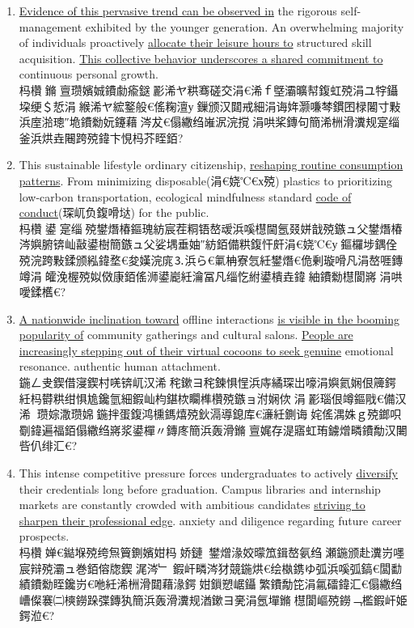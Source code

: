 ﻿\documentclass[lang=cn,11pt]{elegantbook}
\begin{document}
\begin{enumerate}
杩欑鎶€鏈櫙瑙傚湪鎴戜滑鐨勭幇浠ｇぞ浼氱粨鏋勪腑鏃犲涓嶅湪锛屾櫤鑳借澶囧凡鐗㈢墷閿氬畾鍦ㄤ汉绫荤殑瀛樺湪涔嬩腑銆傚叕姘戜滑姘镐箙鍦颁緷璧栫Щ鍔ㄥ簲鐢ㄧ▼搴忔潵澶勭悊浠栦滑鏃ュ父鐨勭ぞ浜や簨鍔°€傚洜姝わ紝浼犵粺鐨勯潰瀵归潰鐩存帴娌熼€氭ā寮忓凡琚牴鏈€у湴鏀瑰彉銆?
\item \underline{Evidence of this pervasive trend can be observed in} the rigorous self-management exhibited by the younger generation. An overwhelming majority of individuals proactively \underline{allocate their leisure hours to} structured skill acquisition. \underline{This collective behavior underscores a shared commitment to} continuous personal growth.\\杩欑鏅亶瓒嬪娍鐨勮瘉鎹彲浠ヤ粠骞磋交涓€浠ｆ墍灞曠幇鍑虹殑涓ユ牸鑷垜绠＄悊涓緱浠ヤ綋鐜般€傜粷澶у鏁颁汉閮戒細涓诲姩灏嗛棽鏆囨椂闂寸敤浜庢湁璁″垝鐨勬妧鑳藉涔犮€傝繖绉嶉泦浣撹涓哄桨鏄句簡浠栦滑瀵规寔缁釜浜烘垚闀跨殑鍏卞悓杩芥眰銆?
\item This sustainable lifestyle  ordinary citizenship, \underline{reshaping routine consumption patterns}. From minimizing disposable(涓€娆℃€х殑) plastics to prioritizing low-carbon transportation, ecological mindfulness  standard \underline{code of conduct}(琛屼负鍑嗗垯) for the public.\\杩欑鍙寔缁殑鐢熸椿鏂瑰紡宸茬粡铻嶅叆浜嗘櫘閫氬叕姘戠殑鏃ュ父鐢熸椿涔嬩腑锛屾敼鍙樹簡鏃ュ父娑堣垂妯″紡銆備粠鍑忓皯涓€娆℃€у鏂欏埗鍝佺殑浣跨敤鍒颁紭鍏堥€夋嫨浣庣⒊浜ら€氭柟寮忥紝鐢熸€佹剰璇嗗凡涓嶅啀鏄竴涓皬浼楃殑姒傚康銆傜浉鍙嶏紝瀹冨凡缁忔紨鍙樻垚鍏紬鐨勬櫘閬嶈涓哄噯鍒欍€?
\item \underline{A nationwide inclination toward} offline interactions \underline{is visible in the booming popularity of} community gatherings and cultural salons. \underline{People are increasingly stepping out of their virtual cocoons to seek genuine} emotional resonance.  authentic human attachment.\\鍦ㄥ叏鍥借寖鍥村唴锛屼汉浠秺鏉ヨ秺鍊惧悜浜庤繘琛岀嚎涓嬩氦娴佷簰鍔紝杩欎粠绀惧尯鑱氫細鍜屾枃鍖栨矙榫欑殑鏃ョ泭娴佽涓彲瑙佷竴鏂戙€備汉浠瓒婃潵瓒婂鍦拌蛋鍑鸿櫄鎷熺殑鈥滆導鎴库€濓紝鍘诲姹傜湡姝ｇ殑鎯呮劅鍏遍福銆傝繖绉嶈浆鍙樿〃鏄庝簡浜轰滑鏅亶娓存湜寤虹珛鐪熷疄鐨勪汉闄呰仈绯汇€?
\item This intense competitive pressure forces undergraduates to actively \underline{diversify} their credentials long before graduation. Campus libraries and internship markets are constantly crowded with ambitious candidates \underline{striving to sharpen their professional edge}.  anxiety and diligence regarding future career prospects.\\杩欑婵€鐑堢殑绔炰簤鍘嬪姏杩娇鏈鐢熷湪姣曚笟鍓嶅氨绉瀬鍦颁赴瀵岃嚜宸辩殑灞ュ巻銆傛牎鍥浘涔﹂鍜屽疄涔犲競鍦烘€绘槸鎸ゆ弧浜嗘弧鎬€闆勫績鐨勬眰鑱岃€咃紝浠栦滑閮藉湪鍔姏鎻愬崌鑷繁鐨勪笓涓氱礌鍏汇€傝繖绉嶆儏褰㈡樉鐒跺弽鏄犱簡浜轰滑瀵规湭鏉ヨ亴涓氬墠鏅櫘閬嶇殑鐒﹁檻鍜屽姫鍔涖€?

\end{enumerate}
\end{document}
